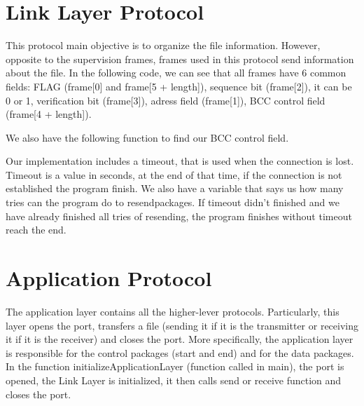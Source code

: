 \documentclass[a4paper]{article}
\begin{document}
\section{Link Layer Protocol}

This protocol main objective is to organize the file information. However, opposite to the supervision frames, frames used in this protocol send information about the file. In the following code, we can see that all frames have 6 common fields: FLAG (frame[0] and frame[5 + length]), sequence bit (frame[2]), it can be 0 or 1, verification bit (frame[3]), adress field (frame[1]), BCC control field (frame[4 + length]).


We also have the following function to find our BCC control field.


Our implementation includes a timeout, that is used when the connection is lost. Timeout is a value in seconds, at the end of that time, if the connection is not established the program finish. We also have a variable that says us how many tries can the program do to resendpackages. If timeout didn’t finished and we have already finished all tries of resending, the program finishes without timeout reach the end.


\section{Application Protocol}

The application layer contains all the higher-lever protocols. Particularly, this layer opens the port, transfers a file (sending it if it is the transmitter or receiving it if it is the receiver) and closes the port. More specifically, the application layer is responsible for the control packages (start and end) and for the data packages. In the function initializeApplicationLayer (function called in main), the port is opened, the Link Layer is initialized, it then calls send or receive function and closes the port.
\end{document}
